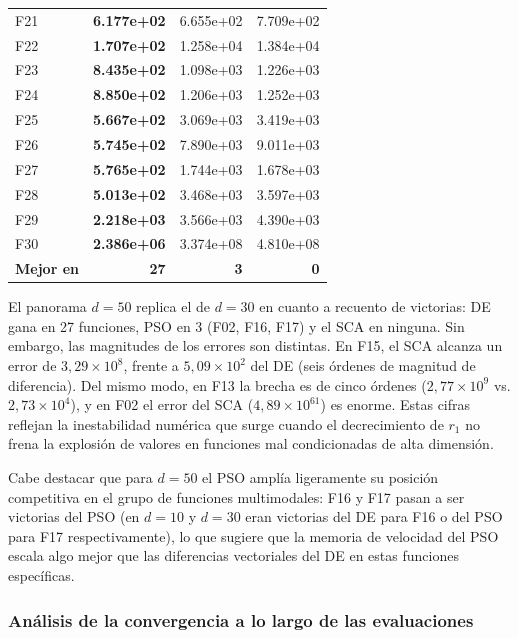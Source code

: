 \documentclass[12pt,a4paper]{article}
\begin{document}
\begin{longtable}{lrrr}
F21  & \textbf{6.177e+02} & 6.655e+02 & 7.709e+02 \\
F22  & \textbf{1.707e+02} & 1.258e+04 & 1.384e+04 \\
F23  & \textbf{8.435e+02} & 1.098e+03 & 1.226e+03 \\
F24  & \textbf{8.850e+02} & 1.206e+03 & 1.252e+03 \\
F25  & \textbf{5.667e+02} & 3.069e+03 & 3.419e+03 \\
F26  & \textbf{5.745e+02} & 7.890e+03 & 9.011e+03 \\
F27  & \textbf{5.765e+02} & 1.744e+03 & 1.678e+03 \\
F28  & \textbf{5.013e+02} & 3.468e+03 & 3.597e+03 \\
F29  & \textbf{2.218e+03} & 3.566e+03 & 4.390e+03 \\
F30  & \textbf{2.386e+06} & 3.374e+08 & 4.810e+08 \\
\midrule
\textbf{Mejor en} & \textbf{27} & \textbf{3} & \textbf{0} \\
\end{longtable}
 
El panorama $d=50$ replica el de $d=30$ en cuanto a recuento de victorias: DE gana en 27 funciones, PSO en 3 (F02, F16, F17) y el SCA en ninguna. Sin embargo, las magnitudes de los errores son distintas. En F15, el SCA alcanza un error de $3{,}29 \times 10^8$, frente a $5{,}09 \times 10^2$ del DE (seis órdenes de magnitud de diferencia). Del mismo modo, en F13 la brecha es de cinco órdenes ($2{,}77 \times 10^9$ vs. $2{,}73 \times 10^4$), y en F02 el error del SCA ($4{,}89 \times 10^{61}$) es enorme. Estas cifras reflejan la inestabilidad numérica que surge cuando el decrecimiento de $r_1$ no frena la explosión de valores en funciones mal condicionadas de alta dimensión.
 
Cabe destacar que para $d=50$ el PSO amplía ligeramente su posición competitiva en el grupo de funciones multimodales: F16 y F17 pasan a ser victorias del PSO (en $d=10$ y $d=30$ eran victorias del DE para F16 o del PSO para F17 respectivamente), lo que sugiere que la memoria de velocidad del PSO escala algo mejor que las diferencias vectoriales del DE en estas funciones específicas.
 
\subsubsection{Análisis de la convergencia a lo largo de las evaluaciones}
 
\end{document}
